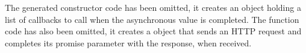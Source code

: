 \documentclass[american,english,runningheads]{llncs}
\begin{document}
The generated  constructor code has been omitted, it creates an object holding a list of callbacks to call when the asynchronous value is completed. The  function code has also been omitted, it creates a  object that sends an HTTP request and completes its promise parameter with the response, when received.

% 
% 
% 
% 
% 
% 
% 
%   
\end{document}
